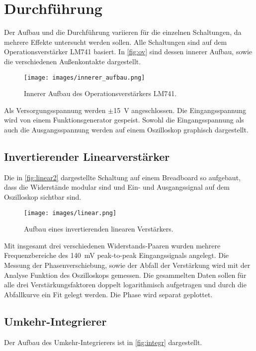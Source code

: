 \newpage
\section{Durchführung}
\label{sec:durchfuehrung}

Der Aufbau und die Durchführung variieren für die einzelnen Schaltungen, da mehrere Effekte untersucht werden sollen.
Alle Schaltungen sind auf dem Operationsverstärker LM741 basiert\cite{lm741}.
In \autoref{fig:ov} sind dessen innerer Aufbau, sowie die verschiedenen Außenkontakte dargestellt.

\begin{figure}[H]
    \centering
    \texttt{[image: images/innerer\_aufbau.png]}
    \caption{Innerer Aufbau des Operationsverstärkers LM741.\cite{lm741}}
    \label{fig:ov}
\end{figure}

Als Versorgungsspannung werden $\pm$\SI{15}{\volt} angeschlossen.
Die Eingangsspannung wird von einem Funktionsgenerator gespeist.
Sowohl die Eingangsspannung als auch die Ausgangsspannung werden auf einem Oszilloskop graphisch dargestellt.

\subsection{Invertierender Linearverstärker}
Die in \autoref{fig:linear2} dargestellte Schaltung auf einem Breadboard so aufgebaut, dass die Widerstände modular sind und Ein- und Ausgangssignal auf dem Oszilloskop sichtbar sind.

\begin{figure}[H]
    \centering
    \texttt{[image: images/linear.png]}
    \caption{Aufbau eines invertierenden linearen Verstärkers.\cite{V51}}
    \label{fig:linear2}
\end{figure}

Mit insgesamt drei verschiedenen Widerstands-Paaren wurden mehrere Frequenzbereiche des \SI{140}{\milli\volt} peak-to-peak Eingangssignals angelegt.
Die Messung der Phasenverschiebung, sowie der Abfall der Verstärkung wird mit der Analyse Funktion des Oszilloskops gemessen.
Die gesammelten Daten sollen für alle drei Verstärkungsfaktoren doppelt logarithmisch aufgetragen und durch die Abfallkurve ein Fit gelegt werden.
Die Phase wird separat geplottet.

\subsection{Umkehr-Integrierer}
Der Aufbau des Umkehr-Integrierers ist in \autoref{fig:integr} dargestellt.

